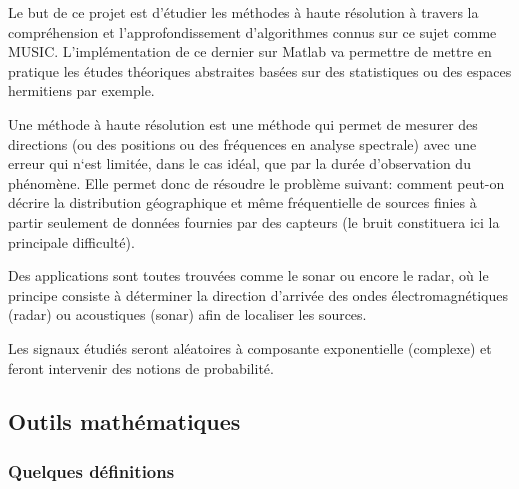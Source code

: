 \documentclass{article}
\begin{document}
Le but de ce projet est d'étudier les méthodes à haute résolution à travers la compréhension et l'approfondissement d'algorithmes connus sur ce sujet comme MUSIC. L'implémentation de ce dernier sur Matlab va permettre de mettre en pratique les études théoriques abstraites basées sur des statistiques ou des espaces hermitiens par exemple.


Une méthode à haute résolution est une méthode qui permet de mesurer des directions (ou des positions ou des fréquences en analyse spectrale) avec une erreur qui n‘est limitée, dans le cas idéal, que par la durée d'observation du phénomène. Elle permet donc de résoudre le problème suivant: comment peut-on décrire la distribution géographique et
même fréquentielle de sources finies à partir seulement de données fournies par des capteurs
(le bruit constituera ici la principale difficulté).


Des applications sont toutes trouvées comme le sonar ou encore le radar, où le principe consiste à déterminer la direction d'arrivée des ondes électromagnétiques (radar) ou 
acoustiques (sonar) afin de localiser les sources. 


Les signaux étudiés seront aléatoires à composante exponentielle (complexe) et feront intervenir des notions de probabilité.


\vspace*{20pt}



\subsection{Outils mathématiques } 


\subsubsection{Quelques définitions}
\end{document}
